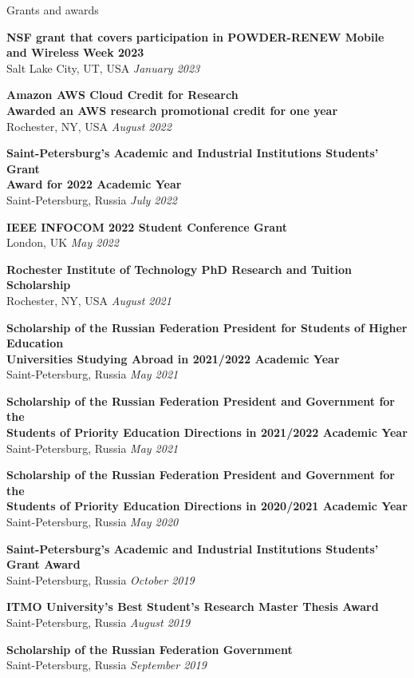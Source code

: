 \documentclass[10pt]{resume} %
\begin{document}
\begin{rSection}{Grants and awards}

\textbf{NSF grant that covers participation in POWDER-RENEW Mobile and Wireless Week 2023} \\
Salt Lake City, UT, USA \hfill {\em January 2023}

\textbf{Amazon AWS Cloud Credit for Research} \\ \textbf{Awarded an AWS research promotional credit for one year} \\
Rochester, NY, USA \hfill {\em August 2022}

\textbf{Saint-Petersburg’s Academic and Industrial Institutions Students’ Grant} \\ \textbf{Award for 2022 Academic Year} \\
Saint-Petersburg, Russia \hfill {\em July 2022} 

\textbf{IEEE INFOCOM 2022 Student Conference Grant}\\
London, UK \hfill {\em May 2022}

\textbf{Rochester Institute of Technology PhD Research and Tuition Scholarship} \\
Rochester, NY, USA \hfill {\em August 2021}

\textbf{Scholarship of the Russian Federation President for Students of Higher Education} \\ \textbf{Universities Studying Abroad in 2021/2022 Academic Year} \\
Saint-Petersburg, Russia \hfill {\em May 2021}

\textbf{Scholarship of the Russian Federation President and Government for the} \\ \textbf{Students of Priority Education Directions in 2021/2022 Academic Year} \\
Saint-Petersburg, Russia \hfill {\em May 2021}

\textbf{Scholarship of the Russian Federation President and Government for the}\\ \textbf{Students of Priority Education Directions in 2020/2021 Academic Year} \\
Saint-Petersburg, Russia  \hfill {\em May 2020} 

\textbf{Saint-Petersburg's Academic and Industrial Institutions Students' Grant Award} \\
Saint-Petersburg, Russia \hfill {\em October 2019}

\textbf{ITMO University's Best Student's Research Master Thesis Award} \\
Saint-Petersburg, Russia \hfill {\em August 2019}

\textbf{Scholarship of the Russian Federation Government} \\
Saint-Petersburg, Russia \hfill {\em September 2019}
\end{rSection}
\end{document}
